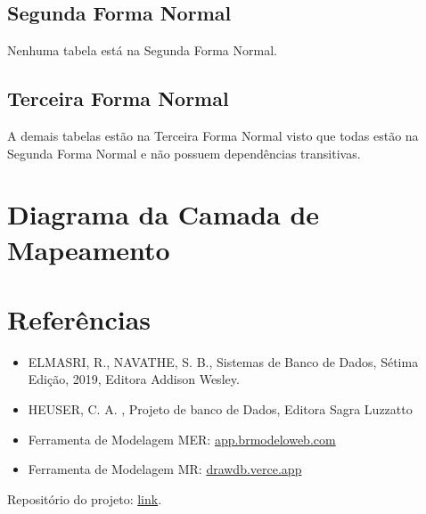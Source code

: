 \documentclass{article}
\begin{document}
\subsection{Segunda Forma Normal}
Nenhuma tabela está na Segunda Forma Normal.

\subsection{Terceira Forma Normal}
A demais tabelas estão na Terceira Forma Normal visto que todas estão na Segunda Forma Normal e não possuem dependências transitivas.

\section{Diagrama da Camada de Mapeamento}

\section{Referências}
\begin{itemize}
        \item ELMASRI, R., NAVATHE, S. B., Sistemas de Banco de Dados, Sétima Edição, 2019, Editora Addison Wesley.
        \item HEUSER, C. A. , Projeto de banco de Dados, Editora Sagra Luzzatto
        \item Ferramenta de Modelagem MER: \href{https://app.brmodeloweb.com/#!/conceptual/66dd8939bb821248818df271}{app.brmodeloweb.com}
        \item Ferramenta de Modelagem MR: \href{https://drawdb.vercel.app/}{drawdb.verce.app}
\end{itemize}

Repositório do projeto: \href{https://github.com/qrno/BD-2024-1}{link}.
\end{document}
